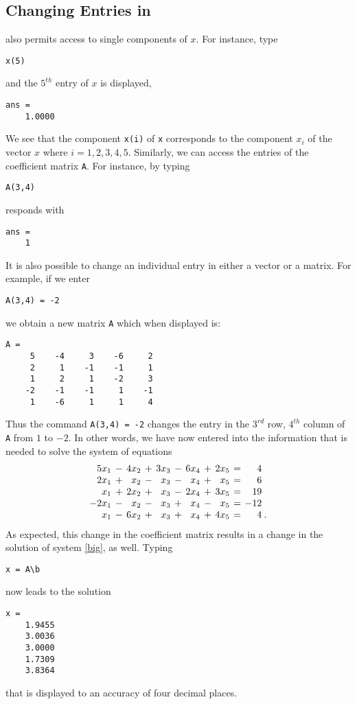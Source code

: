 \documentclass{ximera}
\begin{document}
\subsection*{Changing Entries in \Matlab}

\Matlab also permits access to single components of $x$.  For
instance, type
\begin{verbatim}
x(5)
\end{verbatim}
and the $5^{th}$ entry of $x$ is displayed,
\begin{verbatim}
ans =
    1.0000
\end{verbatim}
We see that the component {\tt x(i)} of {\tt x} corresponds to
the component $x_i$ of the vector $x$ where $i=1,2,3,4,5$.
Similarly, we can access the entries of the coefficient matrix
 {\tt A}.
For instance, by typing
\begin{verbatim}
A(3,4)
\end{verbatim}
\Matlab responds with
\begin{verbatim}
ans =
    1
\end{verbatim}

It is also possible to change an individual entry in either a vector
or a matrix.  For example, if we enter
\begin{verbatim}
A(3,4) = -2
\end{verbatim}  
we obtain a new matrix {\tt A} which when displayed is:
\begin{verbatim}
A =
     5    -4     3    -6     2
     2     1    -1    -1     1
     1     2     1    -2     3
    -2    -1    -1     1    -1
     1    -6     1     1     4
\end{verbatim}
Thus the command {\tt A(3,4) = -2} changes the entry in the
$3^{rd}$ row, $4^{th}$ column of {\tt A} from $1$ to $-2$.
In other words, we have now entered into \Matlab the
information that is needed to solve the system of equations
\[
\arraycolsep 2pt
\begin{array}{rcrcrcrcrcrl}
 5x_1 & - & 4x_2 & + & 3x_3 & - &  6x_4 & + & 2x_5 & = &   4  & \\
 2x_1 & + &  x_2 & - &  x_3 & - &   x_4 & + &  x_5 & = &   6  & \\
  x_1 & + & 2x_2 & + &  x_3 & - &  2x_4 & + & 3x_5 & = &  19  & \\
-2x_1 & - &  x_2 & - &  x_3 & + &   x_4 & - &  x_5 & = & -12  & \\
x_1 & - & 6x_2 & + & x_3 & + & x_4 & + & 4x_5 & = & 4 & \! .
\end{array}
\]
As expected, this change in the coefficient matrix results in a
change in the solution of system \eqref{big}, as well.  Typing
\begin{verbatim}
x = A\b
\end{verbatim}
now leads to the solution
\begin{verbatim}
x =
    1.9455
    3.0036
    3.0000
    1.7309
    3.8364
\end{verbatim}
that is displayed to an accuracy of four decimal places.
\end{document}
